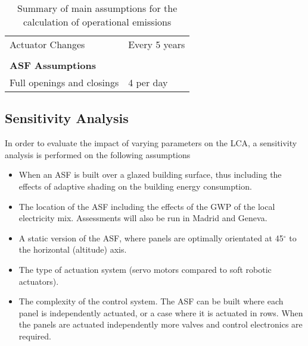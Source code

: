\begin{description}
\begin{table}[H]
\begin{tabular}{ll}
Actuator Changes              & Every 5 years                                  \\
                              &                                                \\
\textbf{ASF Assumptions}         &                                                \\
Full openings and closings  & 4 per day                                      \\
\hline
\end{tabular}
\caption{Summary of main assumptions for the calculation of operational emissions}
\label{tab:AssumptionsOpp4}
\end{table}


\end{description}



\subsection{Sensitivity Analysis}
\label{ch:meth:sens}

In order to evaluate the impact of varying parameters on the LCA, a sensitivity analysis is performed on the following assumptions
\begin{itemize}
\item When an ASF is built over a glazed building surface, thus including the effects of adaptive shading on the building energy consumption.
\item The location of the ASF including the effects of the GWP of the local electricity mix. Assessments will also be run in Madrid and Geneva.
\item A static version of the ASF, where panels are optimally orientated at 45$^{\circ}$ to the horizontal (altitude) axis.
\item The type of actuation system (servo motors compared to soft robotic actuators).
\item The complexity of the control system. The ASF can be built where each panel is independently actuated, or a case where it is actuated in rows. When the panels are actuated independently more valves and control electronics are required.

\end{itemize}
